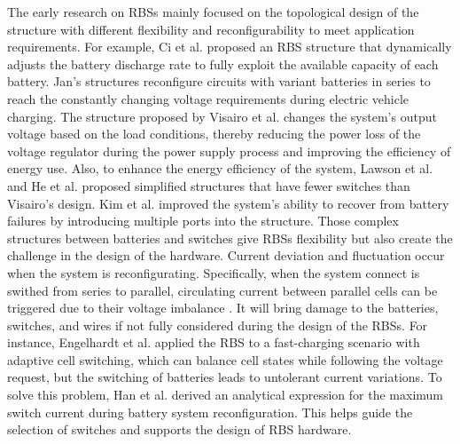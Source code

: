 \documentclass{article}
\begin{document}
The early research on RBSs mainly focused on the topological design of the structure with different flexibility and reconfigurability to meet application requirements.
For example, Ci et al. \cite{ci2007novel} proposed an RBS structure that dynamically adjusts the battery discharge rate to fully exploit the available capacity of each battery. 
Jan's \cite{9209774,engelhardt2021double} structures reconfigure circuits with variant batteries in series to reach the constantly changing voltage requirements during electric vehicle charging.
The structure proposed by Visairo et al. \cite{visairoReconfigurableBatteryPack2008} changes the system's output voltage based on the load conditions, thereby reducing the power loss of the voltage regulator during the power supply process and improving the efficiency of energy use. 
Also, to enhance the energy efficiency of the system, Lawson et al. \cite{lawsonSoftwareConfigurableBattery2012} and He et al. \cite{he2014reconfiguration}  proposed simplified structures that have fewer switches than Visairo's design.
Kim et al. \cite{kim2009dynamic} improved the system's ability to recover from battery failures by introducing multiple ports into the structure. 
Those complex structures between batteries and switches give RBSs flexibility but also create the challenge in the design of the hardware. 
Current deviation and fluctuation occur when the system is reconfigurating.
Specifically, when the system connect is swithed from series to parallel, circulating current between parallel cells can be triggered due to their voltage imbalance \cite{hanAnalysisEstimationMaximum2020}.
It will bring damage to the batteries, switches, and wires if not fully considered during the design of the RBSs.
For instance, Engelhardt et al. \cite{engelhardtDoubleStringBatterySystem2021} applied the RBS to a fast-charging scenario with adaptive cell switching, which can balance cell states while following the voltage request, but the switching of batteries leads to untolerant current variations. 
To solve this problem, Han et al. \cite{han2021analysis} derived an analytical expression for the maximum switch current during battery system reconfiguration. 
This helps guide the selection of switches and supports the design of RBS hardware.
\end{document}
